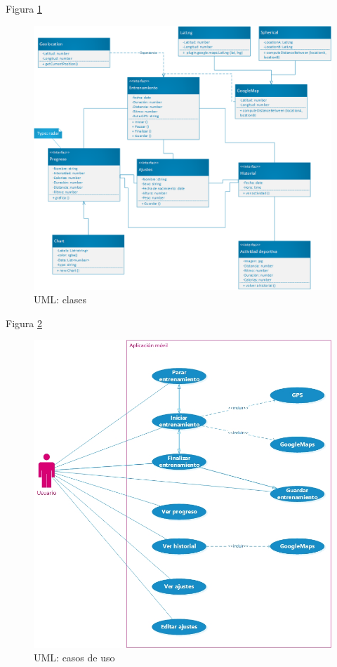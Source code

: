 \documentclass[a4paper, 11pt]{article}
\begin{document}
\begin{itemize}
      Figura \ref{f:uml-clases}
        \begin{figure}[H]
         \centering
         \includegraphics[width=1\textwidth]{UMLclases}
         \caption{UML: clases}
         \label{f:uml-clases}
        \end{figure}

        Figura \ref{f:uml-casos}
          \begin{figure}[H]
           \centering
           \includegraphics[width=1\textwidth]{UMLcasosdeuso}
           \caption{UML: casos de uso}
           \label{f:uml-casos}
          \end{figure}



\end{itemize}
\end{document}

